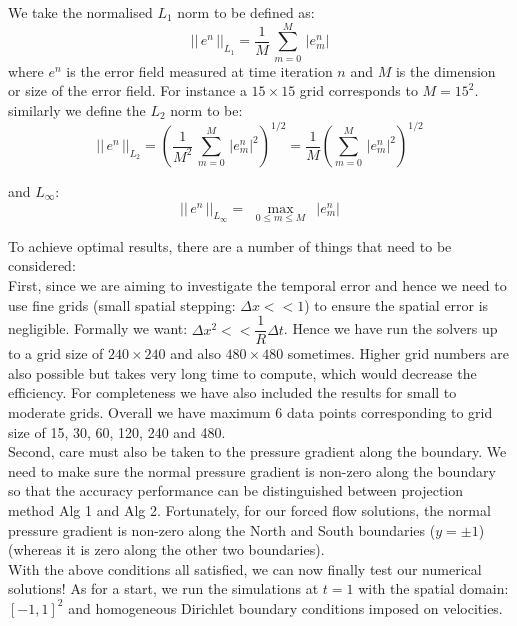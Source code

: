 We take the normalised $L_1$ norm to be defined as:
\begin{equation}
||\,e^n\,||_{L_1} = \dfrac{1}{M}\,\sum^M_{m=0}\,|e^n_m|
\end{equation} 
where $e^n$ is the error field measured at time iteration $n$ and $M$ is the dimension or size of the error field. For instance a $15 \times 15$ grid corresponds to $M = 15^2$.\\

similarly we define the $L_2$ norm to be:
\begin{equation}
||\,e^n\,||_{L_2} = \left(\dfrac{1}{M^2}\,\sum^M_{m=0}\,|e^n_m|^2\right)^{1/2} = \dfrac{1}{M}\left(\sum^M_{m=0}\,|e^n_m|^2\right)^{1/2}
\end{equation}

and $L_\infty$:
\begin{equation}
||\,e^n\,||_{L_\infty} = \max_{\,\,\,0 \leq m \leq M\,\,\,}\,|e^n_m|
\end{equation}

To achieve optimal results, there are a number of things that need to be considered: \\
First, since we are aiming to investigate the temporal error and hence we need to use fine grids (small spatial stepping: $\Delta x <<1$) to ensure the spatial error is negligible. Formally we want: $\Delta x^2 << \dfrac{1}{R}\Delta t$. Hence we have run the solvers up to a grid size of $240 \times 240$ and also $480 \times 480$ sometimes. Higher grid numbers are also possible but takes very long time to compute, which would decrease the efficiency. For completeness we have also included the results for small to moderate grids. Overall we have maximum 6 data points corresponding to grid size of 15, 30, 60, 120, 240 and 480.\\

Second, care must also be taken to the pressure gradient along the boundary. We need to make sure the normal pressure gradient is non-zero along the boundary so that the accuracy performance can be distinguished between projection method Alg 1 and Alg 2. Fortunately, for our forced flow solutions, the normal pressure gradient is non-zero along the North and South boundaries ($y = \pm 1$) (whereas it is zero along the other two boundaries).\\

With the above conditions all satisfied, we can now finally test our numerical solutions! As for a start, we run the simulations at $t = 1$ with the spatial domain: $[-1,1]^2$ and homogeneous Dirichlet boundary conditions imposed on velocities.\\

